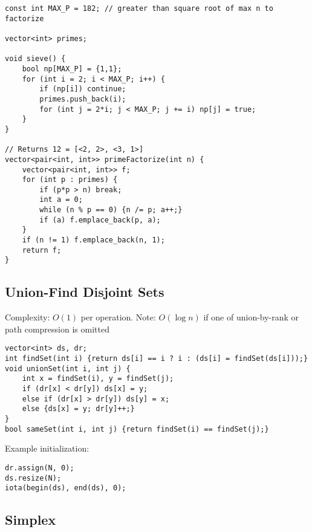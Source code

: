 \documentclass[letterpaper]{article}
\begin{document}
\begin{lstlisting}
const int MAX_P = 182; // greater than square root of max n to factorize

vector<int> primes;

void sieve() {
	bool np[MAX_P] = {1,1};
	for (int i = 2; i < MAX_P; i++) {
		if (np[i]) continue;
		primes.push_back(i);
		for (int j = 2*i; j < MAX_P; j += i) np[j] = true;
	}
}

// Returns 12 = [<2, 2>, <3, 1>]
vector<pair<int, int>> primeFactorize(int n) {
	vector<pair<int, int>> f;
	for (int p : primes) {
		if (p*p > n) break;
		int a = 0;
		while (n % p == 0) {n /= p; a++;}
		if (a) f.emplace_back(p, a);
	}
	if (n != 1) f.emplace_back(n, 1);
	return f;
}
\end{lstlisting}

\subsection{Union-Find Disjoint Sets}

Complexity: $O\left(1\right)$ per operation. Note: $O\left(\log n\right)$ if one of union-by-rank or path compression is omitted

\begin{lstlisting}
vector<int> ds, dr;
int findSet(int i) {return ds[i] == i ? i : (ds[i] = findSet(ds[i]));}
void unionSet(int i, int j) {
	int x = findSet(i), y = findSet(j);
	if (dr[x] < dr[y]) ds[x] = y;
	else if (dr[x] > dr[y]) ds[y] = x;
	else {ds[x] = y; dr[y]++;}
}
bool sameSet(int i, int j) {return findSet(i) == findSet(j);}
\end{lstlisting}

Example initialization:

\begin{lstlisting}
dr.assign(N, 0);
ds.resize(N);
iota(begin(ds), end(ds), 0);
\end{lstlisting}

\clearpage
\subsection{Simplex}
\end{document}
